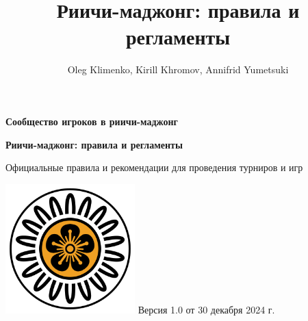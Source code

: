 \documentclass[a4paper]{article}
\author{Oleg Klimenko, Kirill Khromov, Annifrid Yumetsuki}
\title{Риичи-маджонг: правила и регламенты}
\begin{document}
	\setlength\parindent{15pt}
	\pagestyle{empty}
	\begin{center}
		\LARGE
		{\bfseries Сообщество игроков в риичи-маджонг\par}
		\vspace{4cm}
		{\huge\bfseries Риичи-маджонг: правила и регламенты\par}
		\vspace{3cm}
		\par
		
		\normalsize
		Официальные правила и рекомендации для проведения турниров и игр\par
		\vspace{5cm}
		\includegraphics[width=5cm]{logo}
		\vfill
		Версия 1.0 от 30 декабря 2024 г.
	\end{center}
	\newpage
	
	\tableofcontents
	\newpage
	
	\pagestyle{plain}
	
	
	\newpage
	
	\newpage
	
	\newpage
	
	\newpage
	
	\newpage
	
	\newpage
	
	\newpage
	
	\newpage
	
	\newpage
	
	\newpage
	
	
\end{document}
